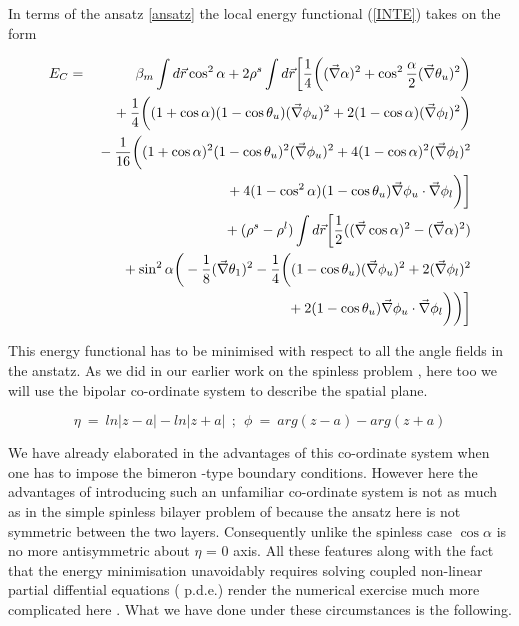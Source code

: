 In terms of the ansatz \ref{ansatz} 
the local energy functional (\ref{INTE}) takes on the form

\begin{eqnarray} E_{C} & = & \beta_{m} \int d \vec{r} \cos^{2}\alpha 
+2\rho^{s} \int d \vec{r} \bigg{[} \frac{1}{4} \bigg{(}
(\vec{\nabla} \alpha)^{2}
+ \cos^{2}\frac{\alpha}{2}(\vec{\nabla} \theta_{u})^{2} \bigg{)}
\nonumber \\ & & \mbox{} + \frac{1}{4}
\bigg{(} (1 +\cos \alpha)(1 - \cos \theta_{u})(
\vec{\nabla} \phi_{u})^{2} +
2(1 - \cos \alpha)(\vec{\nabla} \phi_{l})^{2} \bigg{)} \nonumber \\ 
& & \mbox{} - \frac{1}{16} \bigg{(} (1 +\cos \alpha)^{2}
(1 - \cos \theta_{u})^{2}(\vec{\nabla} \phi_{u})^{2} +
4(1 - \cos \alpha)^{2}(\vec{\nabla} \phi_{l})^{2} \nonumber \\ 
& & \mbox{} + 4(1-\cos^{2} \alpha )
(1 - \cos\theta_{u})
\vec{\nabla} \phi_{u} \cdot \vec{\nabla} \phi_{l} \bigg{)}
\bigg{]} \nonumber \\ 
& & \mbox{} +(\rho^{s} - \rho^{l})
\int d \vec{r}\bigg{[} \frac{1}{2}(
(\vec{\nabla} \cos \alpha )^{2} - (\vec{\nabla} \alpha)^{2} ) \nonumber \\
& & \mbox{} +\sin ^{2} \alpha \bigg{(} -\frac{1}{8}
(\vec{\nabla} \theta_{1})^{2} 
-\frac{1}{4} \bigg{(} (1 - \cos \theta_{u})
(\vec{\nabla} \phi_{u})^{2} +2
(\vec{\nabla} \phi_{l})^{2} \nonumber \\
& & \mbox{} + 2(1 - \cos \theta_{u}) 
\vec{\nabla} \phi_{u} \cdot \vec{\nabla} \phi_{l} \bigg{)} \bigg{)}
\bigg{]} \label{Ebs}\end{eqnarray}

This energy functional has to be minimised with respect to all the
angle fields in the anstatz.
As we did in our earlier work on the spinless problem \cite{Ghosh2},
here too we will use the
bipolar co-ordinate system \cite{Margenau} to describe the spatial plane.

\begin{equation} \eta \  = \ ln |z-a| - ln |z+a| \ \ ; \ \ \phi \ = \ arg(z-a) - arg(z+a)
\end{equation}

We have already elaborated in \cite{Ghosh2} 
the advantages of this co-ordinate
system when one has to impose the bimeron
-type boundary conditions. However here the advantages of introducing such an
unfamiliar co-ordinate system is not as much
as in the simple spinless bilayer problem of \cite{Ghosh2} because
the ansatz here is not symmetric between the two layers. 
Consequently unlike the spinless case
$\cos \alpha$ is no more antisymmetric about $\eta$ = 0 axis. 
All these features
along with the fact that the energy minimisation
unavoidably requires solving coupled non-linear partial diffential equations
( p.d.e.) render the numerical exercise much more complicated here . What 
we have done under these circumstances is the following.

